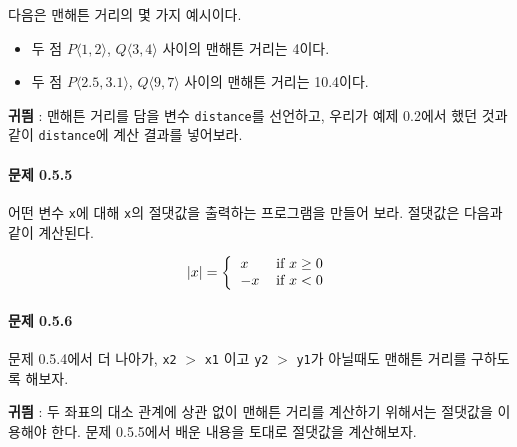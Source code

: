\documentclass[../main.tex]{subfiles}
\begin{document}
다음은 맨해튼 거리의 몇 가지 예시이다.

\begin{itemize}
\item 두 점 $P\langle{}1, 2\rangle{}$, $Q\langle{}3, 4\rangle{}$ 사이의
  맨해튼 거리는 4이다.
\item 두 점 $P\langle{}2.5, 3.1\rangle{}$, $Q\langle{}9, 7\rangle{}$
  사이의 맨해튼 거리는 10.4이다.
\end{itemize}

\textbf{귀띔} : 맨해튼 거리를 담을 변수 \texttt{distance}를 선언하고,
우리가 예제 0.2에서 했던 것과 같이 \texttt{distance}에 계산 결과를 넣어보라.

\paragraph{문제 0.5.5} 어떤 변수 \texttt{x}에 대해 \texttt{x}의
절댓값을 출력하는 프로그램을 만들어 보라. 절댓값은 다음과 같이 계산된다.

\[
  |x| = \left\{
    \begin{tabular}{l l}
      $x$ & if $x \geq 0$\\
      $-x$ & if $x < 0$
    \end{tabular}
  \right.
\]

\paragraph{문제 0.5.6} 문제 0.5.4에서 더 나아가, \texttt{x2} $>$
\texttt{x1} 이고 \texttt{y2} $>$ \texttt{y1}가 아닐때도 맨해튼 거리를
구하도록 해보자.

\textbf{귀띔} : 두 좌표의 대소 관계에 상관 없이 맨해튼 거리를 계산하기
위해서는 절댓값을 이용해야 한다. 문제 0.5.5에서 배운 내용을 토대로
절댓값을 계산해보자.
\end{document}

